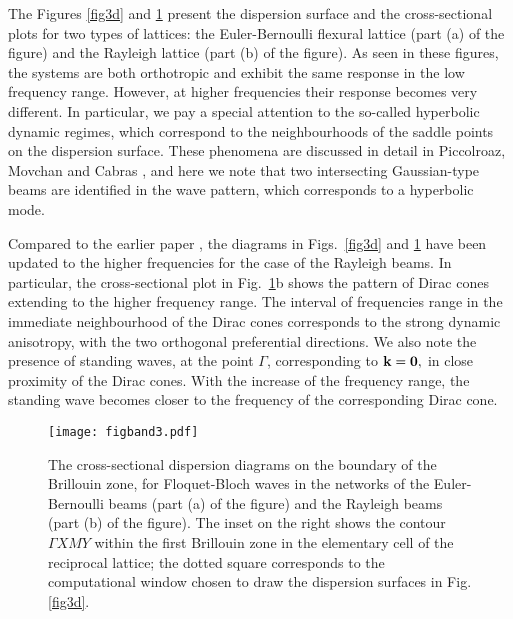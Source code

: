 \documentclass[11pt]{article}
\begin{document}
The Figures \ref{fig3d} and \ref{figband2} present the dispersion surface and the cross-sectional plots for two types of lattices: the Euler-Bernoulli flexural lattice (part (a) of the figure) and the Rayleigh lattice (part (b) of the figure).
As seen in these figures, the systems are both orthotropic and exhibit the same response in the low frequency range. However, at higher frequencies their response becomes very different. In particular, we pay a special attention to the so-called hyperbolic dynamic regimes, which correspond to the neighbourhoods of the saddle points on the dispersion surface. These phenomena are discussed in detail in Piccolroaz, Movchan and Cabras \cite{PMC_2016}, and here we note that two intersecting Gaussian-type beams are identified in the wave pattern, which corresponds to a hyperbolic mode.

Compared to the earlier paper \cite{PMC_2016}, the diagrams in Figs.~\ref{fig3d} and \ref{figband2} have been updated to the higher frequencies for the case of the Rayleigh beams. In particular, the cross-sectional plot in Fig.~\ref{figband2}b shows the pattern of Dirac cones extending to the higher frequency range. The interval of frequencies range in the immediate neighbourhood of the Dirac cones corresponds to the strong dynamic anisotropy, with the two orthogonal preferential directions. We also note the presence of standing waves, at the point $\Gamma$, corresponding to ${\bf k} = {\bf 0},$ in close proximity of the Dirac cones. With the increase of the frequency range, the standing wave becomes closer to  the frequency of the corresponding Dirac cone.

\begin{figure}[!htb]
\centering
\texttt{[image: figband3.pdf]}
\caption{\footnotesize The cross-sectional dispersion diagrams on the boundary of the Brillouin zone, for Floquet-Bloch waves in the networks of the Euler-Bernoulli beams (part (a) of the figure) and the Rayleigh beams (part (b) of the figure). The inset on the right shows the contour $\Gamma XMY$ within the first Brillouin zone in the elementary cell of the reciprocal lattice; the dotted square corresponds to the computational window chosen to draw the dispersion surfaces in Fig.\ref{fig3d}.}
\label{figband2}
\end{figure}

\clearpage
\end{document}
